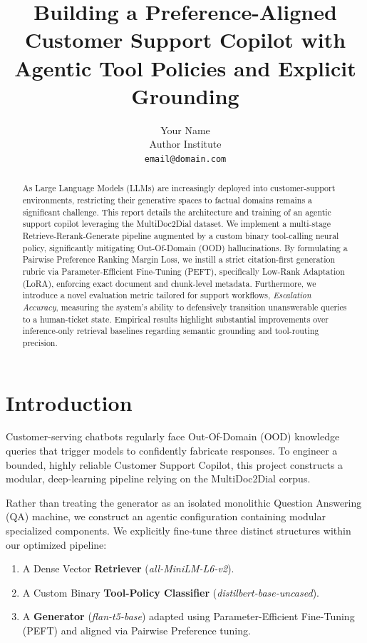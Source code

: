 \documentclass[11pt]{article}
\title{Building a Preference-Aligned Customer Support Copilot with Agentic Tool Policies and Explicit Grounding}
\author{Your Name \\
  Author Institute \\
  \texttt{email@domain.com} \\}
\begin{document}
\maketitle
\begin{abstract}
As Large Language Models (LLMs) are increasingly deployed into customer-support environments, restricting their generative spaces to factual domains remains a significant challenge. This report details the architecture and training of an agentic support copilot leveraging the MultiDoc2Dial dataset. We implement a multi-stage Retrieve-Rerank-Generate pipeline augmented by a custom binary tool-calling neural policy, significantly mitigating Out-Of-Domain (OOD) hallucinations. By formulating a Pairwise Preference Ranking Margin Loss, we instill a strict citation-first generation rubric via Parameter-Efficient Fine-Tuning (PEFT), specifically Low-Rank Adaptation (LoRA), enforcing exact document and chunk-level metadata. Furthermore, we introduce a novel evaluation metric tailored for support workflows, \textit{Escalation Accuracy}, measuring the system's ability to defensively transition unanswerable queries to a human-ticket state. Empirical results highlight substantial improvements over inference-only retrieval baselines regarding semantic grounding and tool-routing precision.
\end{abstract}

\section{Introduction}
Customer-serving chatbots regularly face Out-Of-Domain (OOD) knowledge queries that trigger models to confidently fabricate responses. To engineer a bounded, highly reliable Customer Support Copilot, this project constructs a modular, deep-learning pipeline relying on the MultiDoc2Dial corpus. 

Rather than treating the generator as an isolated monolithic Question Answering (QA) machine, we construct an agentic configuration containing modular specialized components. We explicitly fine-tune three distinct structures within our optimized pipeline:
\begin{enumerate}
    \item A Dense Vector \textbf{Retriever} (\textit{all-MiniLM-L6-v2}).
    \item A Custom Binary \textbf{Tool-Policy Classifier} (\textit{distilbert-base-uncased}).
    \item A \textbf{Generator} (\textit{flan-t5-base}) adapted using Parameter-Efficient Fine-Tuning (PEFT) and aligned via Pairwise Preference tuning.
\end{enumerate}
\end{document}
